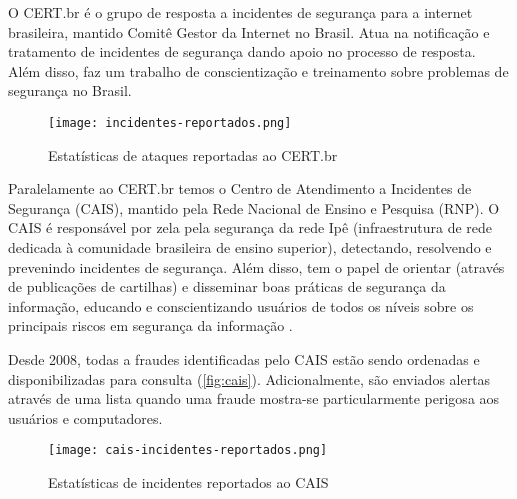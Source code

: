     O CERT.br é o grupo de resposta a incidentes de segurança para a internet brasileira, mantido Comitê Gestor da Internet no Brasil. Atua na notificação e tratamento de incidentes de segurança dando apoio no processo de resposta. Além disso, faz um trabalho de conscientização e treinamento sobre problemas de segurança no Brasil. 

    \begin{figure}[!htb]
     \centering
     \caption{Estatísticas de ataques reportadas ao CERT.br}
     \texttt{[image: incidentes-reportados.png]}
     \label{fig:cert}
    \end{figure}

    Paralelamente ao CERT.br temos o Centro de Atendimento a Incidentes de Segurança (CAIS), mantido pela Rede Nacional de Ensino e Pesquisa (RNP). O CAIS é responsável por zela pela segurança da rede Ipê (infraestrutura de rede dedicada à comunidade brasileira de ensino superior), detectando, resolvendo e prevenindo incidentes de segurança. Além disso, tem o papel de orientar (através de publicações de cartilhas) e disseminar boas práticas de segurança da informação, educando e conscientizando usuários de todos os níveis sobre os principais riscos em segurança da informação \cite{cais}.

    Desde 2008, todas a fraudes identificadas pelo CAIS estão sendo ordenadas e disponibilizadas para consulta (\autoref{fig:cais}). Adicionalmente, são enviados alertas através de uma lista quando uma fraude mostra-se particularmente perigosa aos usuários e computadores.

    \begin{figure}[!htb]
     \centering
     \caption{Estatísticas de incidentes reportados ao CAIS}
     \texttt{[image: cais-incidentes-reportados.png]}
     \label{fig:cais}
    \end{figure}




